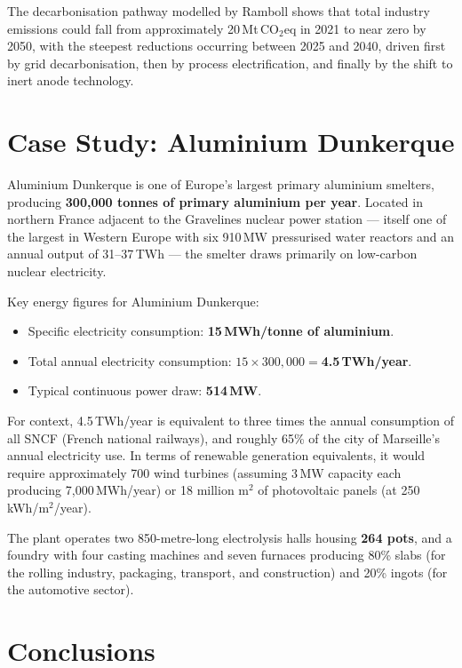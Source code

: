 The decarbonisation pathway modelled by Ramboll shows that total industry emissions could fall from
approximately 20\,Mt\,CO$_2$eq in 2021 to near zero by 2050, with the steepest reductions
occurring between 2025 and 2040, driven first by grid decarbonisation, then by process
electrification, and finally by the shift to inert anode technology.

\section{Case Study: Aluminium Dunkerque}

Aluminium Dunkerque is one of Europe's largest primary aluminium smelters, producing
\textbf{300{,}000 tonnes of primary aluminium per year}. Located in northern France adjacent to
the Gravelines nuclear power station — itself one of the largest in Western Europe with six
910\,MW pressurised water reactors and an annual output of 31--37\,TWh — the smelter draws
primarily on low-carbon nuclear electricity.

Key energy figures for Aluminium Dunkerque:

\begin{itemize}
    \item Specific electricity consumption: \textbf{15\,MWh/tonne of aluminium}.
    \item Total annual electricity consumption: $15 \times 300{,}000 = $\textbf{4.5\,TWh/year}.
    \item Typical continuous power draw: \textbf{514\,MW}.
\end{itemize}

For context, 4.5\,TWh/year is equivalent to three times the annual consumption of all SNCF
(French national railways), and roughly 65\% of the city of Marseille's annual electricity use. In
terms of renewable generation equivalents, it would require approximately 700 wind turbines
(assuming 3\,MW capacity each producing 7{,}000\,MWh/year) or 18 million m$^2$ of photovoltaic
panels (at 250\,kWh/m$^2$/year).

The plant operates two 850-metre-long electrolysis halls housing \textbf{264 pots}, and a foundry
with four casting machines and seven furnaces producing 80\% slabs (for the rolling industry,
packaging, transport, and construction) and 20\% ingots (for the automotive sector).

\section{Conclusions}

